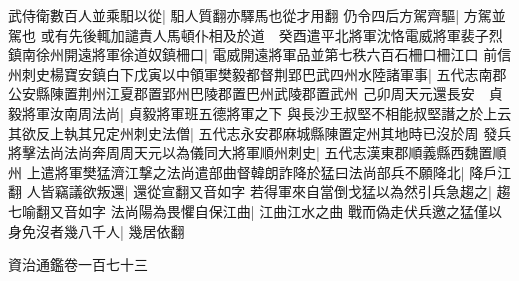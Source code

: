 武侍衛數百人並乘馹以從|{
	馹人質翻亦驛馬也從才用翻}
仍令四后方駕齊驅|{
	方駕並駕也}
或有先後輒加譴責人馬頓仆相及於道　癸酉遣平北將軍沈恪電威將軍裴子烈鎮南徐州開遠將軍徐道奴鎮柵口|{
	電威開遠將軍品並第七秩六百石柵口柵江口}
前信州刺史楊寶安鎮白下戊寅以中領軍樊毅都督荆郢巴武四州水陸諸軍事|{
	五代志南郡公安縣陳置荆州江夏郡置郢州巴陵郡置巴州武陵郡置武州}
己卯周天元還長安　貞毅將軍汝南周法尚|{
	貞毅將軍班五德將軍之下}
與長沙王叔堅不相能叔堅譖之於上云其欲反上執其兄定州刺史法僧|{
	五代志永安郡麻城縣陳置定州其地時已沒於周}
發兵將擊法尚法尚奔周周天元以為儀同大將軍順州刺史|{
	五代志漢東郡順義縣西魏置順州}
上遣將軍樊猛濟江撃之法尚遣部曲督韓朗詐降於猛曰法尚部兵不願降北|{
	降戶江翻}
人皆竊議欲叛還|{
	還從宣翻又音如字}
若得軍來自當倒戈猛以為然引兵急趨之|{
	趨七喻翻又音如字}
法尚陽為畏懼自保江曲|{
	江曲江水之曲}
戰而偽走伏兵邀之猛僅以身免沒者幾八千人|{
	幾居依翻}


資治通鑑卷一百七十三
